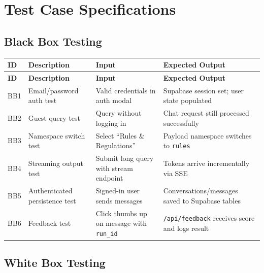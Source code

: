 \documentclass[12pt,a4paper]{book}
\numberwithin{table}{chapter}
\numberwithin{figure}{chapter}
\numberwithin{equation}{chapter}
\begin{document}
\section{Test Case Specifications}

\subsection{Black Box Testing}

\begin{longtable}{|p{0.5in}|p{1.5in}|p{1.5in}|p{1.5in}|}
\hline
\textbf{ID} & \textbf{Description} & \textbf{Input} & \textbf{Expected Output}\\
\hline
\endfirsthead
\hline
\textbf{ID} & \textbf{Description} & \textbf{Input} & \textbf{Expected Output}\\
\hline
\endhead
\hline
BB1 & Email/password auth test & Valid credentials in auth modal & Supabase session set; user state populated\\
\hline
BB2 & Guest query test & Query without logging in & Chat request still processed successfully\\
\hline
BB3 & Namespace switch test & Select ``Rules \& Regulations'' & Payload namespace switches to \texttt{rules}\\
\hline
BB4 & Streaming output test & Submit long query with stream endpoint & Tokens arrive incrementally via SSE\\
\hline
BB5 & Authenticated persistence test & Signed-in user sends messages & Conversations/messages saved to Supabase tables\\
\hline
BB6 & Feedback test & Click thumbs up on message with \texttt{run\_id} & \texttt{/api/feedback} receives score and logs result\\
\hline
\end{longtable}

\subsection{White Box Testing}
\end{document}
